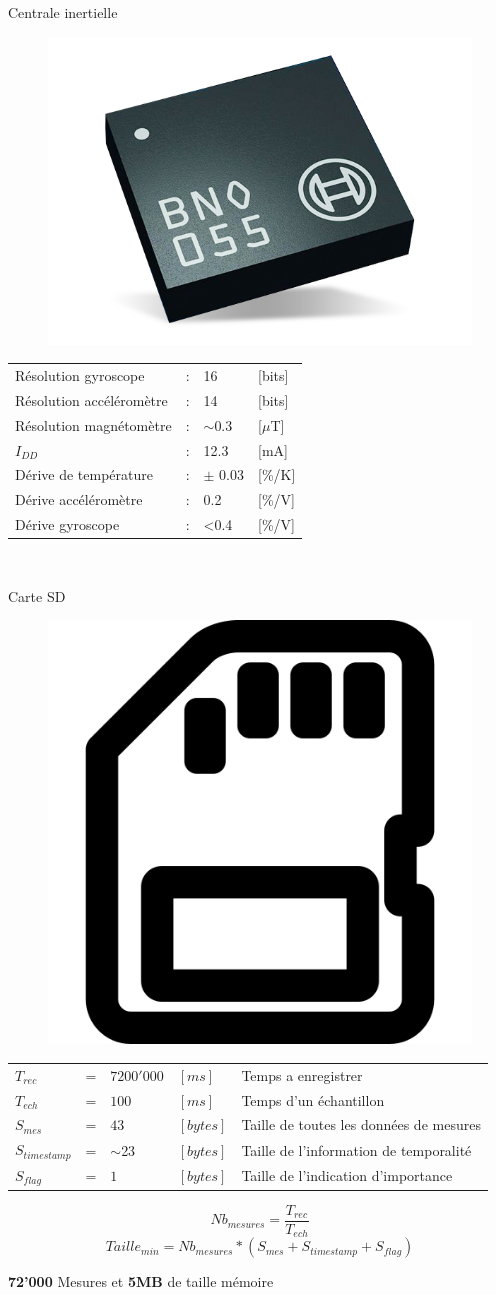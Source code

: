 \documentclass[compress,aspectratio=169]{beamer}
\begin{document}
\begin{frame}[containsverbatim]{Centrale inertielle}
	\begin{figure}
		\centering
		\includegraphics[width=0.3\linewidth]{Images/BNO055-Illustration}
	\end{figure}
	\begin{tabular}{l l l l}
		Résolution gyroscope & : & 16 & [bits] \\
		Résolution accéléromètre & : & 14 & [bits] \\
		Résolution magnétomètre & : & $\sim$0.3 & [$\mu$T] \\
		$I_{DD}$ & : & 12.3 & [mA] \\
		Dérive de température & : & $\pm$ 0.03 & [\%/K] \\ 
		Dérive accéléromètre & : & 0.2 & [\%/V] \\
		Dérive gyroscope & : & <0.4 & [\%/V]
	\end{tabular} \\
\end{frame}

\begin{frame}[containsverbatim]{Carte SD}
	\begin{figure}
		\centering
		\includegraphics[width=0.1\linewidth]{Images/SDcard}
	\end{figure}
	\begin{tabular}{l l ll|l}
		$ T_{rec} $ & = &  $7200'000$ & $[ms]$ & Temps a enregistrer \\
		$ T_{ech}$ & = & $100$  & $[ms]$ & Temps d'un échantillon \\
		$ S_{mes} $ & = & $43$ & $[bytes]$ & Taille de toutes les données de mesures  \\
		$ S_{timestamp} $ & = & $\sim$23 & $[bytes]$ & Taille de l'information de temporalité  \\
		$ S_{flag} $ & = & $ 1 $ & $[bytes]$ & Taille de l'indication d'importance 
	\end{tabular}
    \begin{equation} \label{equ:NbMes}
		Nb_{mesures} = \frac{T_{rec}}{T_{ech}}
	\end{equation} 
	\begin{equation} \label{equ:TailleMin}
		Taille_{min} = Nb_{mesures} * (S_{mes}+S_{timestamp}+S_{flag}) 
	\end{equation}
	
	\textbf{72'000} Mesures et \textbf{5MB} de taille mémoire
\end{frame}
\end{document}
